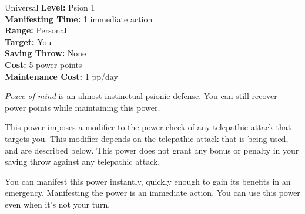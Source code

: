{Universal}
{
	\textbf{Level:}
	Psion 1\\
	\textbf{Manifesting Time:}
	1 immediate action\\
	\textbf{Range:}
	Personal\\
	\textbf{Target:}
	You\\
	\textbf{Saving Throw:}
	None\\
	\textbf{Cost:}
	5 power points\\
	\textbf{Maintenance Cost:}
	1 pp/day\\
}
{
	\emph{Peace of mind} is an almost instinctual psionic defense. You can still recover power points while maintaining this power.

	This power imposes a modifier to the power check of any telepathic attack that targets you. This modifier depends on the telepathic attack that is being used, and are described below. This power does not grant any bonus or penalty in your saving throw against any telepathic attack.


	You can manifest this power instantly, quickly enough to gain its benefits in an emergency. Manifesting the power is an immediate action. You can use this power even when it's not your turn.
}